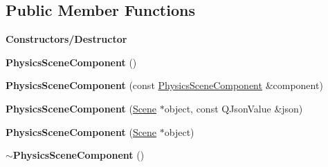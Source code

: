 \subsection*{Public Member Functions}
\begin{Indent}\textbf{ Constructors/\+Destructor}\par
\begin{DoxyCompactItemize}
\item 
\mbox{\label{classrev_1_1_physics_scene_component_a39ea1740d2ef33838e16ab0ae1432270}} 
{\bfseries Physics\+Scene\+Component} ()
\item 
\mbox{\label{classrev_1_1_physics_scene_component_a705f68b107293ab4374a240993b82596}} 
{\bfseries Physics\+Scene\+Component} (const \mbox{\hyperlink{classrev_1_1_physics_scene_component}{Physics\+Scene\+Component}} \&component)
\item 
\mbox{\label{classrev_1_1_physics_scene_component_ab22c272a562e73c5b35feaeae8469a43}} 
{\bfseries Physics\+Scene\+Component} (\mbox{\hyperlink{classrev_1_1_scene}{Scene}} $\ast$object, const Q\+Json\+Value \&json)
\item 
\mbox{\label{classrev_1_1_physics_scene_component_a234d85a11c646fc7f6687ed0720a5329}} 
{\bfseries Physics\+Scene\+Component} (\mbox{\hyperlink{classrev_1_1_scene}{Scene}} $\ast$object)
\item 
\mbox{\label{classrev_1_1_physics_scene_component_a9d7433e2a23e20ba6886b93b9880e39a}} 
{\bfseries $\sim$\+Physics\+Scene\+Component} ()
\end{DoxyCompactItemize}
\end{Indent}
